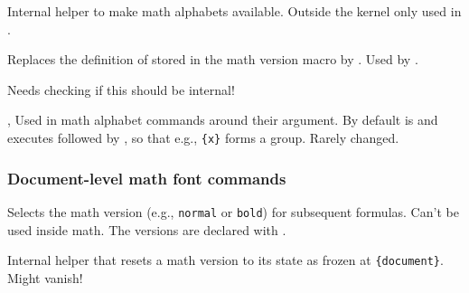 \documentclass{l3in2edoc}
\begin{document}
\begin{function}[int]
  {
    \install@mathalphabet
  }
%
  Internal helper to make math alphabets available. Outside the
  kernel only used in .
\end{function}


\begin{function}[int]
  {
    \extract@alph@from@version
  }
  \begin{syntax}
       
  \end{syntax}
  Replaces the definition of  stored in the
  math version macro  by . Used
  by .

  Needs checking if this should be internal!
\end{function}




\begin{function}[]
  {
    \math@bgroup,
    \math@egroup
  }
  Used in math alphabet commands around their argument. By default
   is  and 
  executes  followed by , so that e.g.,
  \texttt{\{x\}} forms a group. Rarely changed.
\end{function}





\subsubsection{Document-level math font commands}


\begin{function}[user]
  {
    \mathversion
  }
  \begin{syntax}
     
  \end{syntax}
  Selects the math version  (e.g., \texttt{normal} or
  \texttt{bold}) for subsequent formulas. Can't be used inside
  math. The versions are declared with .
\end{function}



\begin{function}[int]
  {
    \unconditionally@reset@math@version
  }
  Internal helper that resets a math version to its state as frozen at
  \texttt{\{document\}}. Might vanish!
\end{function}
\end{document}
